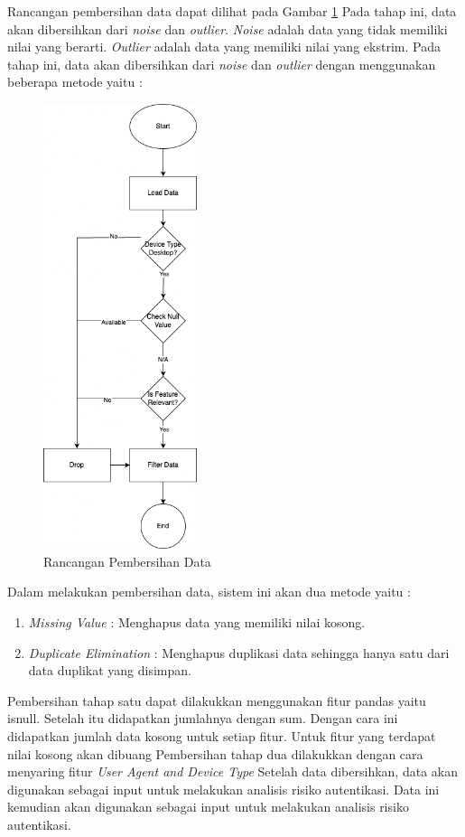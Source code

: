 Rancangan pembersihan data dapat dilihat pada Gambar \ref{fig:pembersihan-data} Pada tahap ini, data akan dibersihkan dari \textit{noise} dan \textit{outlier}. \textit{Noise} adalah data yang tidak memiliki nilai yang berarti. \textit{Outlier} adalah data yang memiliki nilai yang ekstrim. Pada tahap ini, data akan dibersihkan dari \textit{noise} dan \textit{outlier} dengan menggunakan beberapa metode yaitu :

\begin{figure}[H]
    \centering
    \includegraphics[width=0.4\textwidth]{BAB_TESIS/IMAGES/pre-processing.png}
    \caption{Rancangan Pembersihan Data}
    \label{fig:pembersihan-data}
\end{figure}

Dalam melakukan pembersihan data, sistem ini akan dua metode yaitu :

\begin{enumerate}
    \item \textit{Missing Value} : Menghapus data yang memiliki nilai kosong.
    \item \textit{Duplicate Elimination} : Menghapus duplikasi data sehingga hanya satu dari data duplikat yang disimpan. 
\end{enumerate}

Pembersihan tahap satu dapat dilakukkan menggunakan fitur pandas yaitu isnull. Setelah itu didapatkan jumlahnya dengan sum. Dengan cara ini didapatkan jumlah data kosong untuk setiap fitur. Untuk fitur yang terdapat nilai kosong akan dibuang
Pembersihan tahap dua dilakukkan dengan cara menyaring fitur \textit{User Agent and Device Type} 
Setelah data dibersihkan, data akan digunakan sebagai input untuk melakukan analisis risiko autentikasi. Data ini kemudian akan digunakan sebagai input untuk melakukan analisis risiko autentikasi.
